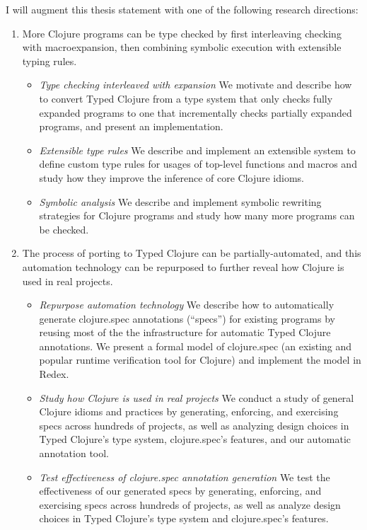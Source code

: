 I will augment this thesis statement with one of the following research directions:

\begin{enumerate}
  \item More Clojure programs can be type checked by first interleaving
    checking with macroexpansion, then combining
    symbolic execution with extensible typing rules.
    \begin{itemize}
      \item \emph{Type checking interleaved with expansion}
        We motivate and describe how to convert Typed Clojure from a type system that only checks fully
        expanded programs to one that incrementally
        checks partially expanded programs, and present an implementation.
      \item \emph{Extensible type rules}
        We describe and implement an extensible system to define custom type rules
        for usages of top-level functions and macros
        and study how they improve the inference of core Clojure idioms.
      \item \emph{Symbolic analysis}
        We describe and implement symbolic rewriting strategies for Clojure
        programs and study how many more programs can be checked.
    \end{itemize}
  \item The process of porting to Typed Clojure can be partially-automated, and this automation technology can be repurposed to further reveal how Clojure is used in real projects.
    \begin{itemize}
      \item \emph{Repurpose automation technology}
        We describe how to automatically generate clojure.spec annotations (``specs'') for existing programs by reusing
        most of the the infrastructure for automatic Typed Clojure annotations.
        We present a formal model of clojure.spec (an existing and popular runtime verification tool for Clojure)
        and implement the model in Redex.
      \item \emph{Study how Clojure is used in real projects}
        We conduct a study of general Clojure idioms and practices by generating, enforcing, and exercising specs
        across hundreds of projects, as well as analyzing design choices in Typed Clojure's type system,
        clojure.spec's features, and our automatic annotation tool.
      \item \emph{Test effectiveness of clojure.spec annotation generation}
        We test the effectiveness of our generated specs by generating, enforcing, and exercising specs
        across hundreds of projects, as well as analyze design choices in Typed Clojure's type system and
        clojure.spec's features.
    \end{itemize}
\end{enumerate}


